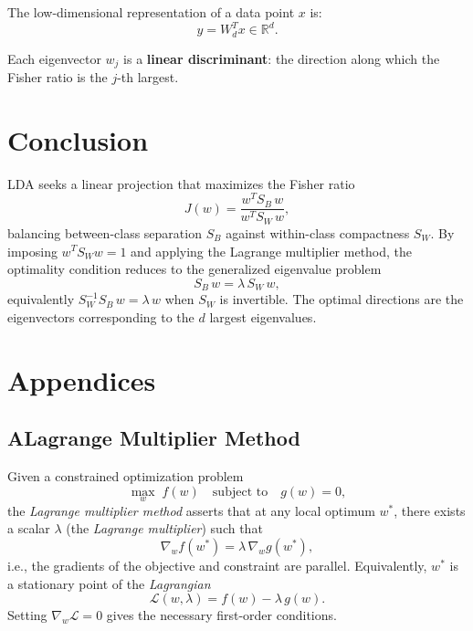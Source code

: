 \documentclass[11pt]{article}
\begin{document}
The low-dimensional representation of a data point $x$ is:
\[
  y = W_d^T x \in \mathbb{R}^d.
\]

Each eigenvector $w_j$ is a \textbf{linear discriminant}: the direction along which the Fisher ratio is the $j$-th largest.

\section*{Conclusion}

LDA seeks a linear projection that maximizes the Fisher ratio
\[
  J(w) = \frac{w^T S_B\, w}{w^T S_W\, w},
\]
balancing between-class separation $S_B$ against within-class compactness $S_W$.
By imposing $w^T S_W w = 1$ and applying the Lagrange multiplier method, the optimality condition reduces to the generalized eigenvalue problem
\[
  S_B\, w = \lambda\, S_W\, w,
\]
equivalently $S_W^{-1}S_B\, w = \lambda\, w$ when $S_W$ is invertible.
The optimal directions are the eigenvectors corresponding to the $d$ largest eigenvalues.

\begin{center}
\end{center}

\appendix
\section*{Appendices}

\subsection*{A\quad Lagrange Multiplier Method}
\label{app:lagrange}

Given a constrained optimization problem
\[
  \max_w\; f(w) \quad \text{subject to} \quad g(w) = 0,
\]
the \emph{Lagrange multiplier method} asserts that at any local optimum $w^*$, there exists a scalar $\lambda$ (the \emph{Lagrange multiplier}) such that
\[
  \nabla_w f(w^*) = \lambda\, \nabla_w g(w^*),
\]
i.e., the gradients of the objective and constraint are parallel.
Equivalently, $w^*$ is a stationary point of the \emph{Lagrangian}
\[
  \mathcal{L}(w,\lambda) = f(w) - \lambda\, g(w).
\]
Setting $\nabla_w \mathcal{L} = 0$ gives the necessary first-order conditions.
\end{document}
